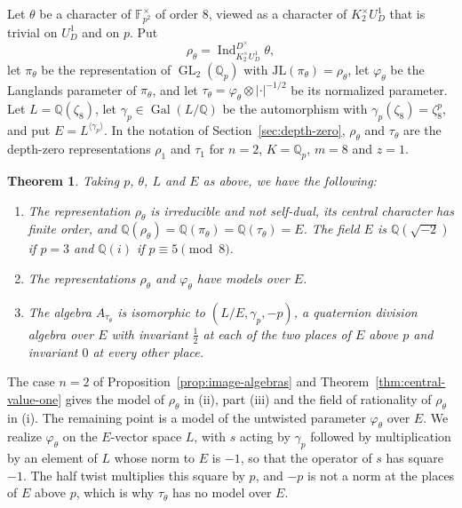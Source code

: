 \documentclass[a4paper,11pt]{amsart}
\newtheorem{theorem}{Theorem}[section]
\theoremstyle{definition}
\theoremstyle{remark}
\numberwithin{equation}{section}
\newcommand{\Q}{\mathbb{Q}}
\DeclareMathOperator{\Gal}{Gal}
\DeclareMathOperator{\GL}{GL}
\newcommand{\F}{\mathbb{F}}
\DeclareMathOperator{\Ind}{Ind}
\newcommand{\JL}{\mathrm{JL}}
\begin{document}
Let $\theta$ be a character of $\F_{p^2}^\times$ of order $8$, viewed as a character of $K_2^\times U_D^1$ that is trivial on $U_D^1$ and on $p$. Put
\[
 \rho_\theta=\Ind_{K_2^\times U_D^1}^{D^\times}\theta,
\]
let $\pi_\theta$ be the representation of $\GL_2(\Q_p)$ with $\JL(\pi_\theta)=\rho_\theta$, let $\varphi_\theta$ be the Langlands parameter of $\pi_\theta$, and let $\tau_\theta=\varphi_\theta\otimes|\cdot|^{-1/2}$ be its normalized parameter. Let $L=\Q(\zeta_8)$, let $\gamma_p\in\Gal(L/\Q)$ be the automorphism with $\gamma_p(\zeta_8)=\zeta_8^p$, and put $E=L^{\langle\gamma_p\rangle}$. In the notation of Section~\ref{sec:depth-zero}, $\rho_\theta$ and $\tau_\theta$ are the depth-zero representations $\rho_1$ and $\tau_1$ for $n=2$, $K=\Q_p$, $m=8$ and $z=1$.

\begin{theorem}\label{thm:order-eight}
Taking $p$, $\theta$, $L$ and $E$ as above, we have the following:
\begin{enumerate}
\item[(i)] The representation $\rho_\theta$ is irreducible and not self-dual, its central character has finite order, and $\Q(\rho_\theta)=\Q(\pi_\theta)=\Q(\tau_\theta)=E$. The field $E$ is $\Q(\sqrt{-2})$ if $p=3$ and $\Q(i)$ if $p\equiv5\pmod8$.
\item[(ii)] The representations $\rho_\theta$ and $\varphi_\theta$ have models over $E$.
\item[(iii)] The algebra $A_{\tau_\theta}$ is isomorphic to $(L/E,\gamma_p,-p)$, a quaternion division algebra over $E$ with invariant $\frac12$ at each of the two places of $E$ above $p$ and invariant $0$ at every other place.
\end{enumerate}
\end{theorem}

The case $n=2$ of Proposition~\ref{prop:image-algebras} and Theorem~\ref{thm:central-value-one} gives the model of $\rho_\theta$ in (ii), part (iii) and the field of rationality of $\rho_\theta$ in (i). The remaining point is a model of the untwisted parameter $\varphi_\theta$ over $E$. We realize $\varphi_\theta$ on the $E$-vector space $L$, with $s$ acting by $\gamma_p$ followed by multiplication by an element of $L$ whose norm to $E$ is $-1$, so that the operator of $s$ has square $-1$. The half twist multiplies this square by $p$, and $-p$ is not a norm at the places of $E$ above $p$, which is why $\tau_\theta$ has no model over $E$.
\end{document}
